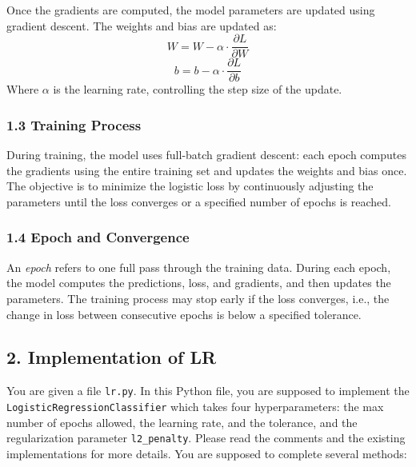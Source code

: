 \documentclass{article}
\begin{document}
Once the gradients are computed, the model parameters are updated using gradient descent. The weights and bias are updated as:
\[
W = W - \alpha \cdot \frac{\partial L}{\partial W}
\]
\[
b = b - \alpha \cdot \frac{\partial L}{\partial b}
\]
Where \(\alpha\) is the learning rate, controlling the step size of the update.

\subsubsection*{1.3 Training Process}

During training, the model uses full-batch gradient descent: each epoch computes the gradients using the entire training set and updates the weights and bias once. The objective is to minimize the logistic loss by continuously adjusting the parameters until the loss converges or a specified number of epochs is reached.

\subsubsection*{1.4 Epoch and Convergence}

An \textit{epoch} refers to one full pass through the training data. During each epoch, the model computes the predictions, loss, and gradients, and then updates the parameters. The training process may stop early if the loss converges, i.e., the change in loss between consecutive epochs is below a specified tolerance.

\subsection*{2. Implementation of LR}
You are given a file \texttt{lr.py}. In this Python file, you are supposed to implement the \texttt{Logistic\allowbreak Regression\allowbreak Classifier} which takes four hyperparameters: the max number of epochs allowed, the learning rate, and the tolerance, and the regularization parameter \texttt{l2\_\allowbreak penalty}.
Please read the comments and the existing implementations for more details. You are supposed to complete several methods:
\end{document}

